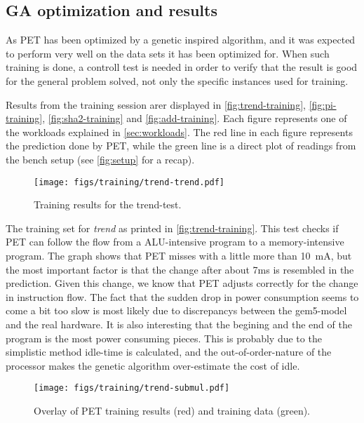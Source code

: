 \subsection{GA optimization and results}

As PET has been optimized by a genetic inspired algorithm, and it was expected
to perform very well on the data sets it has been optimized for. When such
training is done, a controll test is needed in order to verify that the result
is good for the general problem solved, not only the specific instances used for
training.


Results from the training session arer displayed in
\autoref{fig:trend-training}, \autoref{fig:pi-training},
\autoref{fig:sha2-training} and \autoref{fig:add-training}. Each figure
represents one of the workloads explained in \autoref{sec:workloads}.
The red line in each figure represents the prediction done by PET, while
the green line is a direct plot of readings from the bench setup (see \autoref{fig:setup} for a recap).

\begin{figure}[htb]
    \centering
    \texttt{[image: figs/training/trend-trend.pdf]}
    \caption{Training results for the trend-test.}
    \label{fig:trend-training}
\end{figure}

The training set for \emph{trend} as printed in \autoref{fig:trend-training}.
This test checks if PET can follow the flow from a ALU-intensive program to a
memory-intensive program. The graph shows that PET misses with a little more
than 10~mA, but the most important factor is that the change after about 7ms is
resembled in the prediction. Given this change, we know that PET adjusts
correctly for the change in instruction flow. The fact that the sudden drop in
power consumption seems to come a bit too slow is most likely due to
discrepancys between the gem5-model and the real hardware. It is also
interesting that the begining and the end of the program is the most power
consuming pieces. This is probably due to the simplistic method idle-time is
calculated, and the out-of-order-nature of the processor makes the genetic
algorithm over-estimate the cost of idle.

\begin{figure}[htb]
    \centering
    \texttt{[image: figs/training/trend-submul.pdf]}
    \caption{Overlay of PET training results (red) and training data (green).}
    \label{fig:submul-training}
\end{figure}


